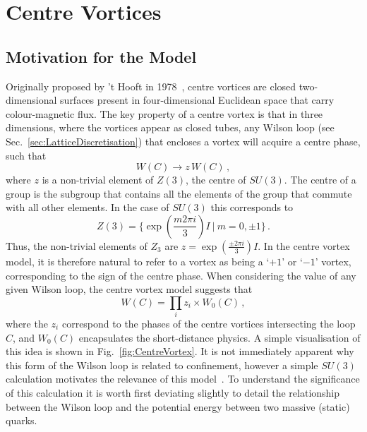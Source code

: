 \section{Centre Vortices}
\subsection{Motivation for the Model}\label{sec:Motivation}
Originally proposed by 't Hooft in 1978~\cite{'tHooft:1977hy,'tHooft:1979uj}, centre vortices are closed two-dimensional surfaces present in four-dimensional Euclidean space that carry colour-magnetic flux. The key property of a centre vortex is that in three dimensions, where the vortices appear as closed tubes, any Wilson loop (see Sec.~\ref{sec:LatticeDiscretisation}) that encloses a vortex will acquire a centre phase, such that
%
\begin{equation}
W(C)\rightarrow z \,W(C)\, ,
\end{equation}
%
where $z$ is a non-trivial element of $Z(3)$, the centre of $SU(3)$. The centre of a group is the subgroup that contains all the elements of the group that commute with all other elements. In the case of $SU(3)$ this corresponds to
%
\begin{equation}
Z(3) = \big\lbrace \exp\left(\frac{m 2\pi i}{3} \right)I ~ | ~ m = 0,\pm 1\big\rbrace\, . 
\end{equation}
%
Thus, the non-trivial elements of $Z_3$ are $z = \exp\left(\frac{\pm 2\pi i}{3}\right)I$. In the centre vortex model, it is therefore natural to refer to a vortex as being a `$+1$' or `$-1$' vortex, corresponding to the sign of the centre phase. When considering the value of any given Wilson loop, the centre vortex model suggests that
%
\begin{equation}
W(C) = \prod_i z_i\times W_0(C)\, ,
\end{equation}
%
where the $z_i$ correspond to the phases of the centre vortices intersecting the loop $C$, and $W_0(C)$ encapsulates the short-distance physics. A simple visualisation of this idea is shown in Fig.~\ref{fig:CentreVortex}. It is not immediately apparent why this form of the Wilson loop is related to confinement, however a simple $SU(3)$ calculation motivates the relevance of this model~\cite{Greensite:2016pfc}. To understand the significance of this calculation it is worth first deviating slightly to detail the relationship between the Wilson loop and the potential energy between two massive (static) quarks.\\
% 
